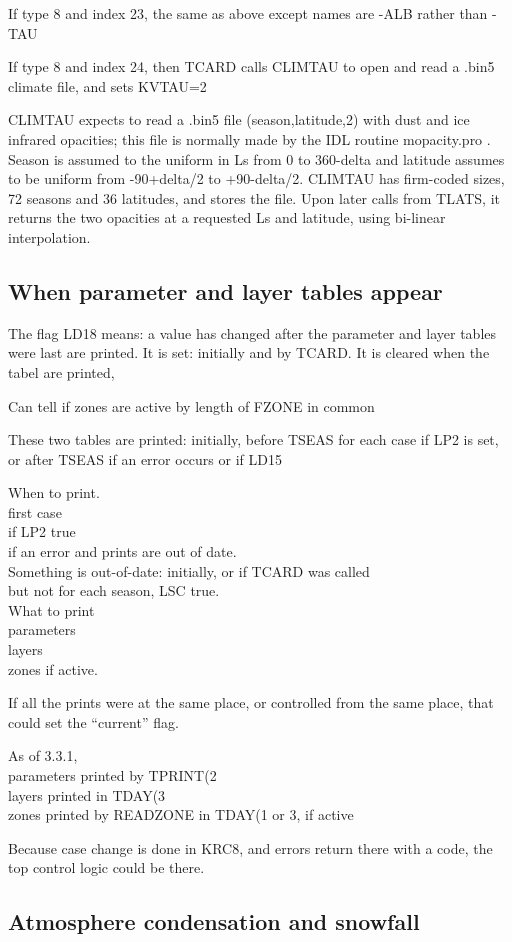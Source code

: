 \documentclass{article}
\newcommand{\qi}{\\ \hspace*{2.em}}      %
\newcommand{\qii}{\\ \hspace*{4.em}}     %
\begin{document}
If type 8 and index 23, the same as above except names are -ALB rather than -TAU

If type 8 and index 24, then TCARD calls CLIMTAU to open and read a .bin5 
climate file, and sets KVTAU=2

CLIMTAU expects to read a .bin5 file (season,latitude,2) with dust and ice
infrared opacities; this file is normally made by the IDL routine mopacity.pro .
Season is assumed to the uniform in Ls from 0 to 360-delta and latitude assumes
to be uniform from -90+delta/2 to +90-delta/2. CLIMTAU has firm-coded sizes, 72
seasons and 36 latitudes, and stores the file. Upon later calls from TLATS, it
returns the two opacities at a requested Ls and latitude, using bi-linear
interpolation.

\subsection{ When parameter and layer tables appear} %
The flag LD18 means: a value has changed after the parameter and layer tables
were last are printed. It is set: initially and by TCARD. It is cleared when the
tabel are printed,

 Can tell if zones are active by length of FZONE in common

These two tables are printed: initially, before TSEAS for each case if LP2 is
set, or after TSEAS if an error occurs or if LD15

When to print.
\qi first case
\qi if LP2 true
\qi if an error and prints are out of date.
\qii Something is out-of-date: initially, or if TCARD was called
\qii but not for each season, LSC true.
\\ What to print
\qi parameters
\qi layers
\qi zones if active.

If all the prints were at the same place, or controlled from the same place,
that could set the ``current'' flag.

As of 3.3.1, 
\qi parameters printed by TPRINT(2
\qi layers printed in TDAY(3
\qi zones printed by READZONE in TDAY(1 or 3, if active

Because case change is done in KRC8, and errors return there with a code,
 the top control logic could be there.  

\subsection{Atmosphere condensation and snowfall} %
\end{document}
